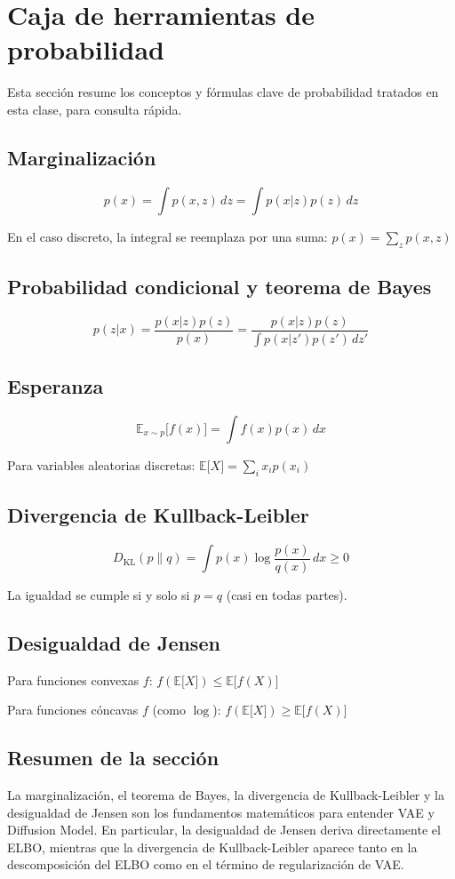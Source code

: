 \section{Caja de herramientas de probabilidad}

Esta sección resume los conceptos y fórmulas clave de probabilidad tratados en esta clase, para consulta rápida.

\subsection{Marginalización}

$$p(x) = \int p(x, z) \, dz = \int p(x|z) p(z) \, dz$$

En el caso discreto, la integral se reemplaza por una suma: $p(x) = \sum_z p(x, z)$

\subsection{Probabilidad condicional y teorema de Bayes}

$$p(z|x) = \frac{p(x|z) p(z)}{p(x)} = \frac{p(x|z) p(z)}{\int p(x|z') p(z') \, dz'}$$

\subsection{Esperanza}

$$\mathbb{E}_{x \sim p}{[}f(x){]} = \int f(x) p(x) \, dx$$

Para variables aleatorias discretas: $\mathbb{E}{[}X{]} = \sum_i x_i p(x_i)$

\subsection{Divergencia de Kullback-Leibler}

$$D_{\mathrm{KL}}(p \| q) = \int p(x) \log \frac{p(x)}{q(x)} \, dx \geq 0$$

La igualdad se cumple si y solo si $p = q$ (casi en todas partes).

\subsection{Desigualdad de Jensen}

Para funciones convexas $f$: $f(\mathbb{E}{[}X{]}) \leq \mathbb{E}{[}f(X){]}$

Para funciones cóncavas $f$ (como $\log$): $f(\mathbb{E}{[}X{]}) \geq \mathbb{E}{[}f(X){]}$

\subsection{Resumen de la sección}

La marginalización, el teorema de Bayes, la divergencia de Kullback-Leibler y la desigualdad de Jensen son los fundamentos matemáticos para entender VAE y Diffusion Model. En particular, la desigualdad de Jensen deriva directamente el ELBO, mientras que la divergencia de Kullback-Leibler aparece tanto en la descomposición del ELBO como en el término de regularización de VAE.

\newpage
